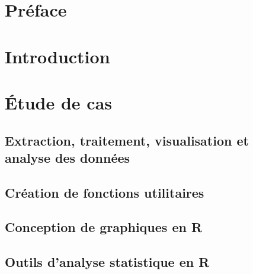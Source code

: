 \documentclass{report}
\newcommand*{\titlePage}{
	\begingroup 
		\hbox{
			\hspace*{0.1\textwidth}
			\rule{1.5pt}{\textheight}
			\hspace*{0.05\textwidth}
			\parbox[b]{0.75\textwidth}{
				{\noindent\LARGE\bfseries Étude de cas:} \\[\baselineskip]
				{\noindent\Huge\bfseries Analyse de marché du} \\
				{\noindent\Huge\bfseries transport aérien} \\
				{\noindent\Huge\bfseries canadien avec R} \\[2\baselineskip]
				{\large\textit{Atelier d'introduction à R}}\\[4\baselineskip]
				{\Large\textsc{Cabral Cruz, Samuel}} \\[2\baselineskip]
				{\large \normalfont{Avec la collaboration de}} \\[\baselineskip]
				{\large\textsc{Beauchemin, David}} \\[\baselineskip]
				{\large\textsc{Goulet, Vincent}} \\[4\baselineskip]
				{\large {Dans le cadre du colloque R à Québec}} \\[\baselineskip]
				{\large {25 mai 2017}} 
				\vspace{0.35\textheight}}}\endgroup}
\begin{document}
\renewcommand{\labelitemi}{\tiny $\blacktriangleright$}
\renewcommand{\labelitemii}{\footnotesize $\bullet$}
\renewcommand{\labelitemiii}{\tiny \ding{117}}
\renewcommand{\labelitemiv}{\small $\star$}

\begin{titlepage}
	\clearpage\thispagestyle{empty}
	\titlePage
\end{titlepage}
\newpage

\tableofcontents
\listoffigures
{}
\lstlistoflistings
{}
\listoftables
{}
\chapter*{Préface}
	

\chapter*{Introduction}
\setcounter{chapter}{1}
	

\chapter*{Étude de cas}
	
\section{Extraction, traitement, visualisation et \\analyse des données}
	

\newpage
\section{Création de fonctions utilitaires}
	
	\label{sec:fctUtil}

\newpage
\section{Conception de graphiques en R}
	

\section{Outils d'analyse statistique en R}
	
	\label{sec:statsTools}
\end{document}
